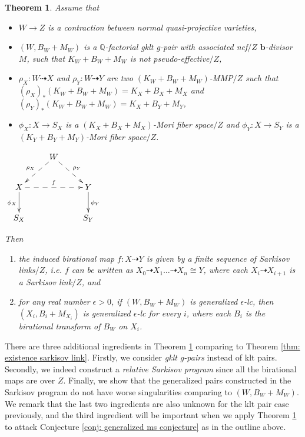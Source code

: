 \documentclass[11pt]{amsart}
\numberwithin{equation}{section}
\newcommand{\bb}{\bm{b}}
\newtheorem{thm}{Theorem}[section]
\theoremstyle{definition}
\theoremstyle{remark}
\theoremstyle{definition}
\begin{document}
\begin{thm}\label{thm: existence generalized Sarkisov link}
Assume that 
\begin{itemize}
    \item $W\rightarrow Z$ is a contraction between normal quasi-projective varieties,
    \item $(W,B_W+M_W)$ is a $\mathbb Q$-factorial gklt g-pair with associated nef$/Z$ $\bb$-divisor $M$, such that $K_W+B_W+M_W$ is not pseudo-effective$/Z$,
    \item $\rho_X: W\dashrightarrow X$ and $\rho_Y: W\dashrightarrow Y$ are two $(K_W+B_W+M_W)$-MMP$/Z$ such that $(\rho_X)_*(K_W+B_W+M_W)=K_X+B_X+M_X$ and $(\rho_Y)_*(K_W+B_W+M_W)=K_X+B_Y+M_Y$,
    \item $\phi_X: X\rightarrow S_X$ is a $(K_X+B_X+M_X)$-Mori fiber space$/Z$ and $\phi_Y: X\rightarrow S_Y$ is a $(K_Y+B_Y+M_Y)$-Mori fiber space$/Z$.
\end{itemize}
\begin{center}$\xymatrix{
 & W\ar@{-->}[dl]_{\rho_X}\ar@{-->}[dr]^{\rho_Y}& \\
      X \ar@{->}[d]_{\phi_X}\ar@{-->}[rr]^{f}   &  & Y\ar@{->}[d]^{\phi_Y} \\
    S_X & &S_Y }$
\end{center}
Then
\begin{enumerate}
    \item the induced birational map $f: X\dashrightarrow Y$ is given by a finite sequence of Sarkisov links$/Z$, i.e. $f$ can be written as $X_0\dashrightarrow X_1\dots\dashrightarrow X_n\cong Y$, where each $X_{i}\dashrightarrow X_{i+1}$ is a Sarkisov link$/Z$, and
    \item for any real number $\epsilon>0$, if $(W,B_W+M_W)$ is generalized $\epsilon$-lc, then $(X_i,B_i+M_{X_i})$ is generalized $\epsilon$-lc for every $i$, where each $B_i$ is the birational transform of $B_W$ on $X_i$.
\end{enumerate} 
\end{thm}

There are three additional ingredients in Theorem \ref{thm: existence generalized Sarkisov link} comparing to Theorem \ref{thm: existence sarkisov link}. Firstly, we consider \emph{gklt g-pairs} instead of klt pairs. Secondly, we indeed construct a \emph{relative Sarkisov program} since all the birational maps are over $Z$. Finally, we show that the generalized pairs constructed in the Sarkisov program do not have worse singularities comparing to $(W,B_W+M_W)$. We remark that the last two ingredients are also unknown for the klt pair case previously, and the third ingredient will be important when we apply Theorem \ref{thm: existence generalized Sarkisov link} to attack Conjecture \ref{conj: generalized ms conjecture} as in the outline above.
\end{document}
